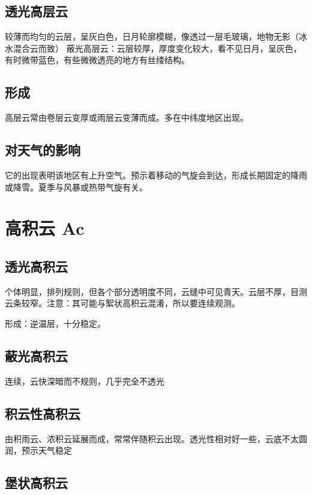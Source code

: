 \documentclass[UTF8,11pt]{ctexbook}
\begin{document}
\subsection{透光高层云}

较薄而均匀的云层，呈灰白色，日月轮廓模糊，像透过一层毛玻璃，地物无影（冰水混合云而致）
蔽光高层云：云层较厚，厚度变化较大，看不见日月，呈灰色，有时微带蓝色，有些微微透亮的地方有丝缕结构。

\subsection{形成}

高层云常由卷层云变厚或雨层云变薄而成。多在中纬度地区出现。

\subsection{对天气的影响}

它的出现表明该地区有上升空气。预示着移动的气旋会到达，形成长期固定的降雨或降雪。夏季与风暴或热带气旋有关。

\section{高积云 Ac}

\subsection{透光高积云}

个体明显，排列规则，但各个部分透明度不同，云缝中可见青天。云层不厚，目测云条较窄。注意：其可能与絮状高积云混淆，所以要连续观测。

形成：逆温层，十分稳定。

\subsection{蔽光高积云}

连续，云快深暗而不规则，几乎完全不透光

\subsection{积云性高积云}

由积雨云、浓积云延展而成，常常伴随积云出现。透光性相对好一些，云底不太圆润，预示天气稳定

\subsection{堡状高积云}
\end{document}
